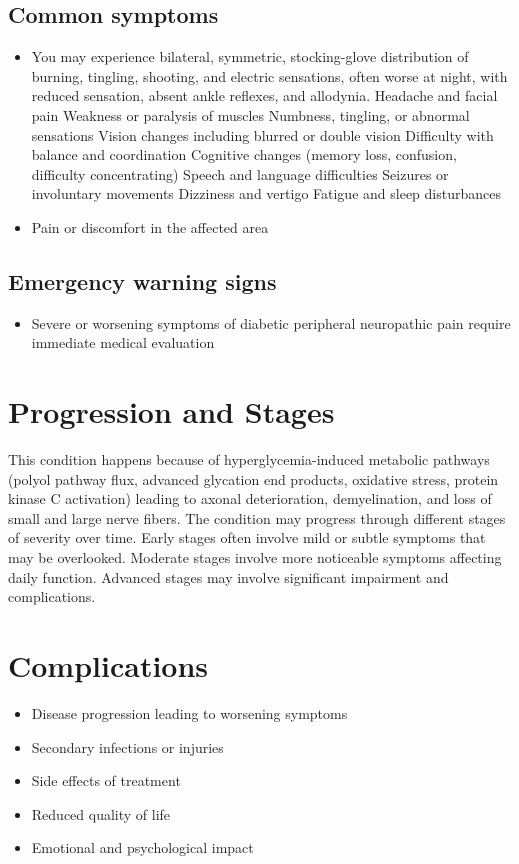 \subsection{Common symptoms}
\begin{itemize}[noitemsep]
  \item You may experience bilateral, symmetric, stocking-glove distribution of burning, tingling, shooting, and electric sensations, often worse at night, with reduced sensation, absent ankle reflexes, and allodynia. Headache and facial pain Weakness or paralysis of muscles Numbness, tingling, or abnormal sensations Vision changes including blurred or double vision Difficulty with balance and coordination Cognitive changes (memory loss, confusion, difficulty concentrating) Speech and language difficulties Seizures or involuntary movements Dizziness and vertigo Fatigue and sleep disturbances
  \item Pain or discomfort in the affected area
  \end{itemize}
\subsection{Emergency warning signs}
\begin{itemize}[noitemsep]
  \item Severe or worsening symptoms of diabetic peripheral neuropathic pain require immediate medical evaluation
\end{itemize}
\section{Progression and Stages}
This condition happens because of hyperglycemia-induced metabolic pathways (polyol pathway flux, advanced glycation end products, oxidative stress, protein kinase C activation) leading to axonal deterioration, demyelination, and loss of small and large nerve fibers. The condition may progress through different stages of severity over time. Early stages often involve mild or subtle symptoms that may be overlooked. Moderate stages involve more noticeable symptoms affecting daily function. Advanced stages may involve significant impairment and complications.
\section{Complications}
\begin{itemize}[noitemsep]
  \item Disease progression leading to worsening symptoms
  \item Secondary infections or injuries
  \item Side effects of treatment
  \item Reduced quality of life
  \item Emotional and psychological impact
\end{itemize}
